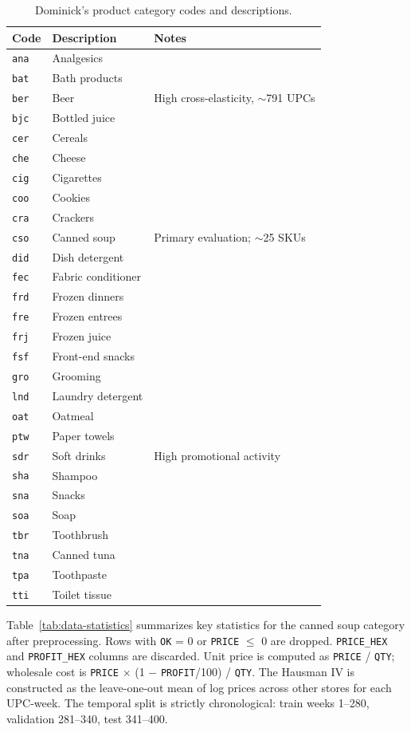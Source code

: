 \begin{table}[h]
\centering
\caption{Dominick's product category codes and descriptions.}
\label{tab:category-codes}
\begin{tabular}{@{}lll@{}}
\toprule
\textbf{Code} & \textbf{Description} & \textbf{Notes} \\
\midrule
\texttt{ana} & Analgesics & \\
\texttt{bat} & Bath products & \\
\texttt{ber} & Beer & High cross-elasticity, $\sim$791 UPCs \\
\texttt{bjc} & Bottled juice & \\
\texttt{cer} & Cereals & \\
\texttt{che} & Cheese & \\
\texttt{cig} & Cigarettes & \\
\texttt{coo} & Cookies & \\
\texttt{cra} & Crackers & \\
\texttt{cso} & Canned soup & Primary evaluation; $\sim$25 SKUs \\
\texttt{did} & Dish detergent & \\
\texttt{fec} & Fabric conditioner & \\
\texttt{frd} & Frozen dinners & \\
\texttt{fre} & Frozen entrees & \\
\texttt{frj} & Frozen juice & \\
\texttt{fsf} & Front-end snacks & \\
\texttt{gro} & Grooming & \\
\texttt{lnd} & Laundry detergent & \\
\texttt{oat} & Oatmeal & \\
\texttt{ptw} & Paper towels & \\
\texttt{sdr} & Soft drinks & High promotional activity \\
\texttt{sha} & Shampoo & \\
\texttt{sna} & Snacks & \\
\texttt{soa} & Soap & \\
\texttt{tbr} & Toothbrush & \\
\texttt{tna} & Canned tuna & \\
\texttt{tpa} & Toothpaste & \\
\texttt{tti} & Toilet tissue & \\
\bottomrule
\end{tabular}
\end{table}

Table~\ref{tab:data-statistics} summarizes key statistics for the canned soup category after preprocessing. Rows with \texttt{OK} = 0 or \texttt{PRICE} $\leq$ 0 are dropped. \texttt{PRICE\_HEX} and \texttt{PROFIT\_HEX} columns are discarded. Unit price is computed as \texttt{PRICE} / \texttt{QTY}; wholesale cost is \texttt{PRICE} $\times$ (1 $-$ \texttt{PROFIT}/100) / \texttt{QTY}. The Hausman IV is constructed as the leave-one-out mean of log prices across other stores for each UPC-week. The temporal split is strictly chronological: train weeks 1--280, validation 281--340, test 341--400.

